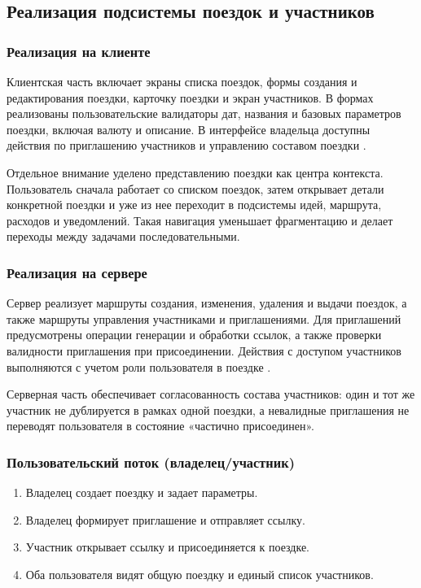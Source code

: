 \subsection{Реализация подсистемы поездок и участников}

\subsubsection{Реализация на клиенте}
Клиентская часть включает экраны списка поездок, формы создания и редактирования поездки, карточку поездки и экран участников. В формах реализованы пользовательские валидаторы дат, названия и базовых параметров поездки, включая валюту и описание. В интерфейсе владельца доступны действия по приглашению участников и управлению составом поездки .

Отдельное внимание уделено представлению поездки как центра контекста. Пользователь сначала работает со списком поездок, затем открывает детали конкретной поездки и уже из нее переходит в подсистемы идей, маршрута, расходов и уведомлений. Такая навигация уменьшает фрагментацию и делает переходы между задачами последовательными.

\subsubsection{Реализация на сервере}
Сервер реализует маршруты создания, изменения, удаления и выдачи поездок, а также маршруты управления участниками и приглашениями. Для приглашений предусмотрены операции генерации и обработки ссылок, а также проверки валидности приглашения при присоединении. Действия с доступом участников выполняются с учетом роли пользователя в поездке .

Серверная часть обеспечивает согласованность состава участников: один и тот же участник не дублируется в рамках одной поездки, а невалидные приглашения не переводят пользователя в состояние «частично присоединен».

\subsubsection{Пользовательский поток (владелец/участник)}
\begin{enumerate}
    \item Владелец создает поездку и задает параметры.
    \item Владелец формирует приглашение и отправляет ссылку.
    \item Участник открывает ссылку и присоединяется к поездке.
    \item Оба пользователя видят общую поездку и единый список участников.
\end{enumerate}

